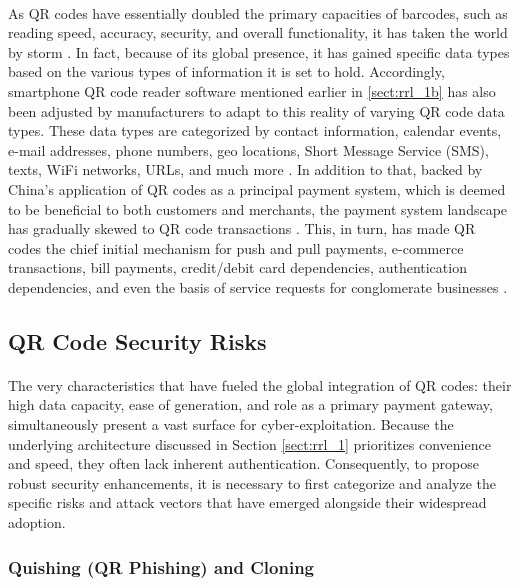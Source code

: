 \documentclass[a4paper]{scl-article}
\begin{document}
\paragraph{}As QR codes have essentially doubled the primary capacities of barcodes, such as reading speed, accuracy, security, and overall functionality, it has taken the world by storm \cite{tu2022}. In fact, because of its global presence, it has gained specific data types based on the various types of information it is set to hold. Accordingly, smartphone QR code reader software mentioned earlier in \ref{sect:rrl_1b} has also been adjusted by manufacturers to adapt to this reality of varying QR code data types. These data types are categorized by contact information, calendar events, e-mail addresses, phone numbers, geo locations, Short Message Service (SMS), texts, WiFi networks, URLs, and much more \cite{worldbank2021}. In addition to that, backed by China’s application of QR codes as a principal payment system, which is deemed to be beneficial to both customers and merchants, the payment system landscape has gradually skewed to QR code transactions \cite{worldbank2021ch5}. This, in turn, has made QR codes the chief initial mechanism for push and pull payments, e-commerce transactions, bill payments, credit/debit card dependencies, authentication dependencies, and even the basis of service requests for conglomerate businesses \cite{worldbank2021ch3}.

\subsection{QR Code Security Risks}
\label{sect:rrl_2}
\paragraph{}The very characteristics that have fueled the global integration of QR codes: their high data capacity, ease of generation, and role as a primary payment gateway, simultaneously present a vast surface for cyber-exploitation. Because the underlying architecture discussed in Section \ref{sect:rrl_1} prioritizes convenience and speed, they often lack inherent authentication. Consequently, to propose robust security enhancements, it is necessary to first categorize and analyze the specific risks and attack vectors that have emerged alongside their widespread adoption.

\subsubsection{Quishing (QR Phishing) and Cloning}
\label{sect:rrl_2a}
\end{document}

